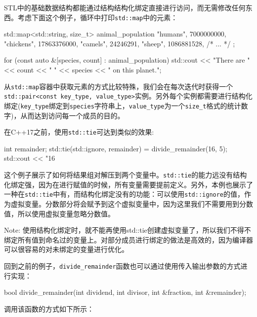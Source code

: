 
STL中的基础数据结构都能通过结构结构化绑定直接进行访问，而无需修改任何东西。考虑下面这个例子，循环中打印\texttt{std::map}中的元素：

\begin{codebox}[cpp]
std::map<std::string, size_t> animal_population {
  {"humans", 7000000000},
  {"chickens", 17863376000},
  {"camels", 24246291},
  {"sheep", 1086881528},
  /* ... */
};

for (const auto &[species, count] : animal_population) {
  std::cout << "There are " << count << " " << species
            << " on this planet.\n";
}
\end{codebox}

从\texttt{std::map}容器中获取元素的方式比较特殊，我们会在每次迭代时获得一个\texttt{std::pair<const key\_type, value\_type>}实例。另外每个实例都需要进行结构化绑定(\texttt{key\_type}绑定到\texttt{species}字符串上，\texttt{value\_type}为一个\texttt{size\_t}格式的统计数字)，从而达到访问每一个成员的目的。

在C++17之前，使用\texttt{std::tie}可达到类似的效果:

\begin{codebox}[cpp]
int remainder;
std::tie(std::ignore, remainder) = divide_remainder(16, 5);
std::cout << "16 %
\end{codebox}

这个例子展示了如何将结果组对解压到两个变量中。\texttt{std::tie}的能力远没有结构化绑定强，因为在进行赋值的时候，所有变量需要提前定义。另外，本例也展示了一种在\texttt{std::tie}中有，而结构化绑定没有的功能：可以使用\texttt{std::ignore}的值，作为虚拟变量。分数部分将会赋予到这个虚拟变量中，因为这里我们不需要用到分数值，所以使用虚拟变量忽略分数值。

\begin{myInfoBox}
Note: 使用结构化绑定时，就不能再使用std::tie创建虚拟变量了，所以我们不得不绑定所有值到命名过的变量上。对部分成员进行绑定的做法是高效的，因为编译器可以很容易的对未绑定的变量进行优化。
\end{myInfoBox}

回到之前的例子，\texttt{divide\_remainder}函数也可以通过使用传入输出参数的方式进行实现：

\begin{codebox}[cpp]
bool divide_remainder(int dividend, int divisor, int &fraction, int &remainder);
\end{codebox}

调用该函数的方式如下所示：


